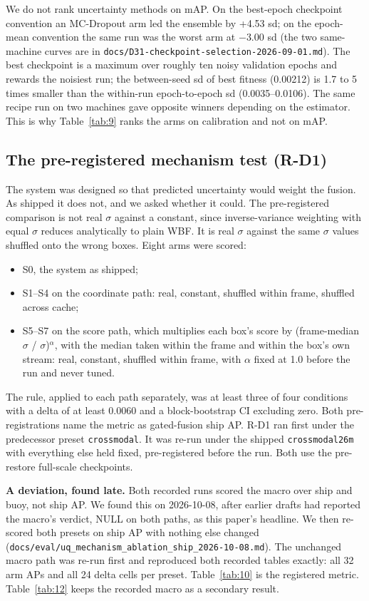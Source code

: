 \documentclass[10pt]{article}
\begin{document}
We do not rank uncertainty methods on mAP. On the best-epoch checkpoint convention an MC-Dropout arm led the ensemble by +4.53 sd; on the epoch-mean convention the same run was the worst arm at $-$3.00 sd (the two same-machine curves are in \texttt{docs/\allowbreak{}D31-checkpoint-selection-2026-09-01.md}). The best checkpoint is a maximum over roughly ten noisy validation epochs and rewards the noisiest run; the between-seed sd of best fitness (0.00212) is 1.7 to 5 times smaller than the within-run epoch-to-epoch sd (0.0035--0.0106). The same recipe run on two machines gave opposite winners depending on the estimator. This is why Table~\ref{tab:9} ranks the arms on calibration and not on mAP.

\subsection{The pre-registered mechanism test (R-D1)}\label{app:E.2}
The system was designed so that predicted uncertainty would weight the fusion. As shipped it does not, and we asked whether it could. The pre-registered comparison is not real $\sigma$ against a constant, since inverse-variance weighting with equal $\sigma$ reduces analytically to plain WBF. It is real $\sigma$ against the same $\sigma$ values shuffled onto the wrong boxes. Eight arms were scored:
\begin{itemize}
\item S0, the system as shipped;
\item S1--S4 on the coordinate path: real, constant, shuffled within frame, shuffled across cache;
\item S5--S7 on the score path, which multiplies each box's score by (frame-median $\sigma$ / $\sigma$)$^{\alpha}$, with the median taken within the frame and within the box's own stream: real, constant, shuffled within frame, with $\alpha$ fixed at 1.0 before the run and never tuned.
\end{itemize}

The rule, applied to each path separately, was at least three of four conditions with a delta of at least 0.0060 and a block-bootstrap CI excluding zero. Both pre-registrations name the metric as gated-fusion ship AP. R-D1 ran first under the predecessor preset \texttt{crossmodal}. It was re-run under the shipped \texttt{crossmodal26m} with everything else held fixed, pre-registered before the run. Both use the pre-restore full-scale checkpoints.

\textbf{A deviation, found late.} Both recorded runs scored the macro over ship and buoy, not ship AP. We found this on 2026-10-08, after earlier drafts had reported the macro's verdict, NULL on both paths, as this paper's headline. We then re-scored both presets on ship AP with nothing else changed (\texttt{docs/\allowbreak{}eval/\allowbreak{}uq\_\allowbreak{}mechanism\_\allowbreak{}ablation\_\allowbreak{}ship\_\allowbreak{}2026-10-08.md}). The unchanged macro path was re-run first and reproduced both recorded tables exactly: all 32 arm APs and all 24 delta cells per preset. Table~\ref{tab:10} is the registered metric. Table~\ref{tab:12} keeps the recorded macro as a secondary result.
\end{document}
